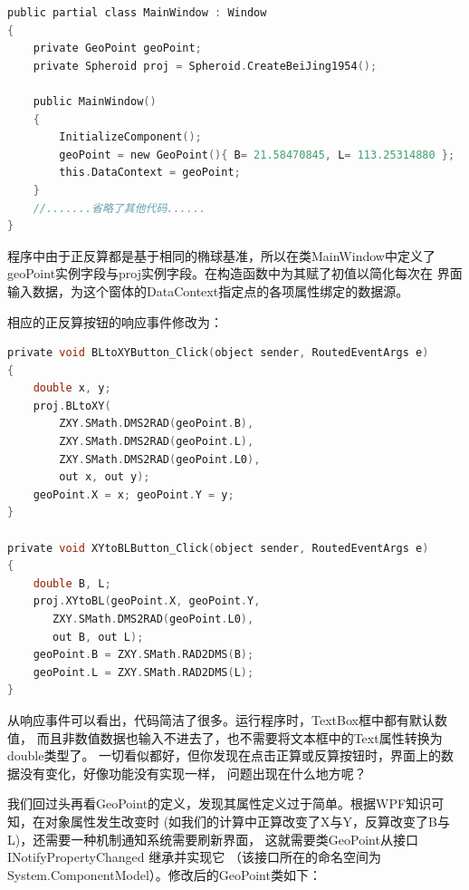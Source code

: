 \begin{lstlisting}[language=C]
public partial class MainWindow : Window
{
    private GeoPoint geoPoint;
    private Spheroid proj = Spheroid.CreateBeiJing1954();

    public MainWindow()
    {
        InitializeComponent();
        geoPoint = new GeoPoint(){ B= 21.58470845, L= 113.25314880 };
        this.DataContext = geoPoint;
    }
    //.......省略了其他代码......
}
\end{lstlisting}

程序中由于正反算都是基于相同的椭球基准，所以在类MainWindow中定义了
geoPoint实例字段与proj实例字段。在构造函数中为其赋了初值以简化每次在
界面输入数据，为这个窗体的DataContext指定点的各项属性绑定的数据源。

相应的正反算按钮的响应事件修改为：

\begin{lstlisting}[language=C]
private void BLtoXYButton_Click(object sender, RoutedEventArgs e)
{
    double x, y;
    proj.BLtoXY(
        ZXY.SMath.DMS2RAD(geoPoint.B),
        ZXY.SMath.DMS2RAD(geoPoint.L),
        ZXY.SMath.DMS2RAD(geoPoint.L0),
        out x, out y);
    geoPoint.X = x; geoPoint.Y = y;
}

private void XYtoBLButton_Click(object sender, RoutedEventArgs e)
{
    double B, L;
    proj.XYtoBL(geoPoint.X, geoPoint.Y,
       ZXY.SMath.DMS2RAD(geoPoint.L0),
       out B, out L);
    geoPoint.B = ZXY.SMath.RAD2DMS(B);
    geoPoint.L = ZXY.SMath.RAD2DMS(L);
}
\end{lstlisting}

从响应事件可以看出，代码简洁了很多。运行程序时，TextBox框中都有默认数值，
而且非数值数据也输入不进去了，也不需要将文本框中的Text属性转换为double类型了。
一切看似都好，但你发现在点击正算或反算按钮时，界面上的数据没有变化，好像功能没有实现一样，
问题出现在什么地方呢？

我们回过头再看GeoPoint的定义，发现其属性定义过于简单。根据WPF知识可知，在对象属性发生改变时
(如我们的计算中正算改变了X与Y，反算改变了B与L)，还需要一种机制通知系统需要刷新界面，
这就需要类GeoPoint从接口 INotifyPropertyChanged 继承并实现它
（该接口所在的命名空间为System.ComponentModel）。修改后的GeoPoint类如下：

